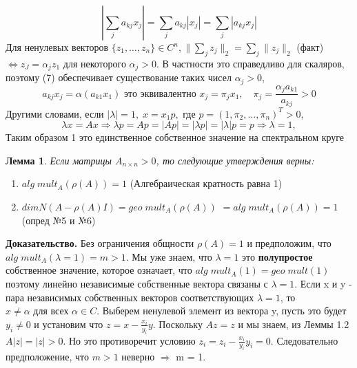 \documentclass[a4paper,12pt,leqno]{article} %
\newtheorem{lemma}[theorem]{Лемма}
\begin{document}
\begin{equation}
    |\sum\limits_{j}a_{kj}x_{j}| = \sum\limits_{j}a_{kj}|x_{j}| = \sum\limits_{j}|a_{kj}x_{j}|
\end{equation}\label{7}
Для ненулевых векторов $\{z_{1}, \dotsc, z_{n}\} \in C^n,
 \| \sum_{j} z_{j} \|_{2} =  \sum_{j} \|z_{j} \|_{2}$
(факт) $\Leftrightarrow   z_{J} = \alpha_{j} z_{1} \text{ для некоторого } \alpha_{j} > 0$.
В частности это справедливо для скаляров, поэтому (7)
обеспечивает существование таких чисел $\alpha_{j} > 0$, 
\begin{equation*}
    a_{kj}x_j = \alpha(a_{k1}x_1) \text{ это эквивалентно } x_j = \pi_j x_1, \quad
    \pi_j = \frac{\alpha_ja_{k1}}{a_{kj}} > 0 
\end{equation*}
Другими словами, если $|\lambda| = 1, \;
  x = x_1p, \text{ где } p = (1, \pi_2, \dotsc, \pi_n)^T > 0$,
\begin{equation*}
    \lambda x = Ax \Rightarrow \lambda p = Ap = |Ap| = 
    |\lambda p| = |\lambda|p = p \Rightarrow \lambda = 1,
\end{equation*}
Таким образом 1 это единственное 
собственное значение на спектральном круге

\begin{lemma}
    \noindent Если матрицы $A_{n \times n} > 0$, 
    то следующие утверждения верны:
\end{lemma}
    \begin{enumerate}
        \item $alg \; mult_{A}(\rho(A)) = 1$ (Алгебраическая кратность равна 1)
        \item $dimN(A - \rho(A)I) = geo \; mult_{A}(\rho(A))$
        $ = alg \; mult_{A}(\rho(A)) = 1$ (опред №5 и №6)
    \end{enumerate}

\noindent\textbf{Доказательство.} 
    Без ограничения общности $\rho(A) = 1$ и 
    предположим, что $alg \; mult_{A} (\lambda = 1) = m > 1$.
    Мы уже знаем, что $\lambda = 1$ это \textbf{полупростое}
    собственное значение, которое означает, что $alg \; mult_{A}(1) = geo \; mult(1)$
    поэтому линейно независимые собственные вектора связаны с $\lambda = 1.$
    Если x и y - пара независимых собственных векторов соответствующих $\lambda = 1$,
    то $x \neq \alpha \text{ для всех } \alpha \in C$. Выберем ненулевой элемент из вектора y,
    пусть это будет $y_{i} \neq 0$ и установим что $z = x - \frac{x_i}{y_i}y.$ Поскольку $Az = z$  и мы знаем,
    из Леммы 1.2 $A|z| = |z| > 0.$ Но это противоречит условию
    $z_i = z_i - \frac{x_i}{y_i}y_i =0.$
    Следовательно предположение, что $m > 1$ неверно $\Rightarrow$ m = 1.
\end{document}
